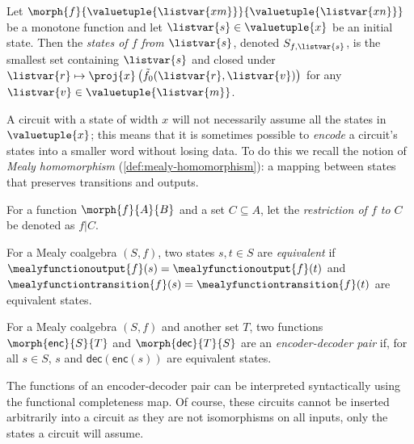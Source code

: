 \begin{definition}[States]
    Let \(\morph{f}{\valuetuple{\listvar{xm}}}{\valuetuple{\listvar{xn}}}\) be a
    monotone function and let \(\listvar{s} \in  \valuetuple{x}\) be an
    initial state.
    Then the \emph{states of \(f\) from \(\listvar{s}\)}, denoted
    \(S_{f,\listvar{s}}\), is the smallest set containing \(\listvar{s}\) and
    closed under \(
    \listvar{r}
    \mapsto
    \proj{x}\left(\tilde{f}_0(\listvar{r},\listvar{v})\right)
    \) for any \(\listvar{v} \in \valuetuple{\listvar{m}}\).
\end{definition}

A circuit with a state of width \(x\) will not necessarily assume all the states
in \(\valuetuple{x}\); this means that it is sometimes possible to \emph{encode}
a circuit's states into a smaller word without losing data.
To do this we recall the notion of \emph{Mealy homomorphism}
(\cref{def:mealy-homomorphism}): a mapping between states that preserves
transitions and outputs.

\begin{notation}[Restriction]
    For a function \(\morph{f}{A}{B}\) and a set \(C \subseteq A\), let
    the \emph{restriction of \(f\) to \(C\)} be denoted as \(f|C\).
\end{notation}

\begin{definition}\label{def:equivalent-states}
    For a Mealy coalgebra \((S, f)\), two states \(s,t \in S\) are
    \emph{equivalent} if
    \(\mealyfunctionoutput{f}(s) = \mealyfunctionoutput{f}(t)\) and
    \(\mealyfunctiontransition{f}(s) = \mealyfunctiontransition{f}(t)\) are
    equivalent states.
\end{definition}

\begin{definition}\label{def:encoder-decoder}
    For a Mealy coalgebra \((S, f)\) and another set \(T\), two functions
    \(\morph{\mathsf{enc}}{S}{T}\) and \(\morph{\mathsf{dec}}{T}{S}\) are an
    \emph{encoder-decoder pair} if, for all \(s \in S\),
    \(s\) and \(\mathsf{dec}(\mathsf{enc}(s))\) are equivalent states.
\end{definition}

The functions of an encoder-decoder pair can be interpreted syntactically using
the functional completeness map.
Of course, these circuits cannot be inserted arbitrarily into a circuit as they
are not isomorphisms on all inputs, only the states a circuit will assume.

